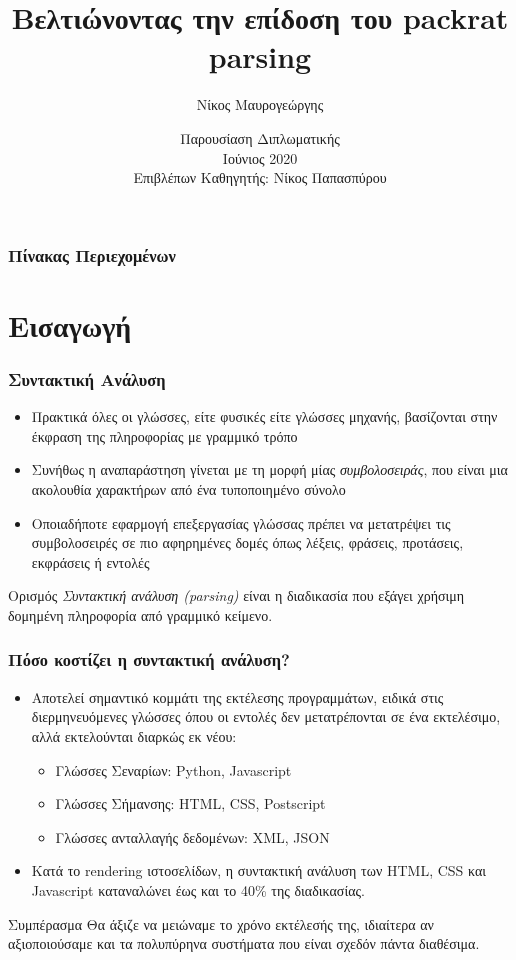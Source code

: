 \documentclass{beamer}
\title[Βελτιώνοντας την επίδοση του packrat parsing] %
{Βελτιώνοντας την επίδοση του packrat parsing}
\author[Νίκος, Μαυρογεώργης] %
{Νίκος Μαυρογεώργης}
\institute[ECE, NTUA] %
{
  Σχολή Ηλεκτρολόγων Μηχανικών και Μηχανικών Υπολογιστών\\
  Εθνικό Μετσόβειο Πολυτεχνείο
}
\date[NTUA 2020] %
{Παρουσίαση Διπλωματικής \\ Ιούνιος 2020 \\ Επιβλέπων Καθηγητής: Νίκος Παπασπύρου}
\begin{document}
\frame{\titlepage}

\begin{frame}
\frametitle{Πίνακας Περιεχομένων}
\tableofcontents
\end{frame}

\iffalse
\section{Εισαγωγή}

\begin{frame}
  \frametitle{Συντακτική Ανάλυση}
  \begin{itemize}	
	\item Πρακτικά όλες οι γλώσσες, είτε φυσικές είτε γλώσσες μηχανής, βασίζονται στην έκφραση της πληροφορίας με γραμμικό τρόπο
	\item Συνήθως η αναπαράστηση γίνεται με τη μορφή μίας \textit{συμβολοσειράς}, που είναι μια ακολουθία χαρακτήρων από ένα τυποποιημένο σύνολο
	\item Οποιαδήποτε εφαρμογή επεξεργασίας γλώσσας πρέπει να μετατρέψει τις συμβολοσειρές σε πιο αφηρημένες δομές όπως λέξεις, φράσεις, προτάσεις, εκφράσεις ή εντολές \pause
  \end{itemize}

\begin{block}{Ορισμός}
  \textit{Συντακτική ανάλυση (parsing)} είναι η διαδικασία που εξάγει χρήσιμη δομημένη πληροφορία από γραμμικό κείμενο.
\end{block}

\end{frame}

\begin{frame}
  \frametitle{Πόσο κοστίζει η συντακτική ανάλυση?} \pause
  \begin{itemize}
	\item Αποτελεί σημαντικό κομμάτι της εκτέλεσης προγραμμάτων, ειδικά στις διερμηνευόμενες γλώσσες όπου οι εντολές δεν μετατρέπονται σε ένα εκτελέσιμο, αλλά εκτελούνται διαρκώς εκ νέου:
  \begin{itemize}
	\item Γλώσσες Σεναρίων: Python, Javascript
	\item Γλώσσες Σήμανσης: HTML, CSS, Postscript
	\item Γλώσσες ανταλλαγής δεδομένων: XML, JSON \pause
  \end{itemize}
\item Κατά το rendering ιστοσελίδων, η συντακτική ανάλυση των HTML, CSS και Javascript καταναλώνει έως και το 40\% της διαδικασίας. \pause
  \end{itemize}

  \begin{block}{Συμπέρασμα}
	Θα άξιζε να μειώναμε το χρόνο εκτέλεσής της, ιδιαίτερα αν αξιοποιούσαμε και τα πολυπύρηνα συστήματα που είναι σχεδόν πάντα διαθέσιμα.
  \end{block}
\end{frame}
\end{document}
